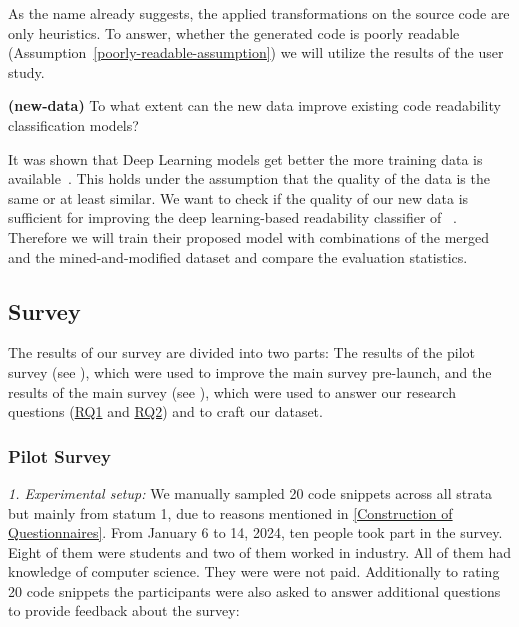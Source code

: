 \documentclass[%
class=scrreprt,
chapterprefix=false,%
open=right,%
twoside=false,%
paper=a4,%
logofile={Logo\_zentral\_farbig\_EN.png},%
thesistype=master,%
UKenglish,%
]{se2thesis}
\theoremstyle{definition}
\begin{document}
	As the name already suggests, the applied transformations on the source code are only heuristics. To answer, whether the generated code is poorly readable (Assumption~\ref{poorly-readable-assumption}) we will utilize the results of the user study.
	
	
	\begin{resq} \textbf{(new-data)} To what extent can the new data improve existing code readability classification models?\end{resq} \label{new-data}
	It was shown that Deep Learning models get better the more training data is available~\cite{hestness2017deep}. This holds under the assumption that the quality of the data is the same or at least similar. We want to check if the quality of our new data is sufficient for improving the deep learning-based readability classifier of \citeauthor{mi2022towards}~\cite{mi2022towards}. Therefore we will train their proposed model with combinations of the merged and the mined-and-modified dataset and compare the evaluation statistics.

\subsection{Survey} \label{Survey}
	The results of our survey are divided into two parts: The results of the pilot survey (see ), which were used to improve the main survey pre-launch, and the results of the main survey (see ), which were used to answer our research questions (\hyperref[mined-well]{RQ1} and \hyperref[modify-poor]{RQ2}) and to craft our dataset.
	
\subsubsection{Pilot Survey} \label{Pilot Survey}
	
	\textit{1. Experimental setup:}
	We manually sampled 20 code snippets across all strata but mainly from statum 1, due to reasons mentioned in \autoref{Construction of Questionnaires}. From January 6 to 14, 2024, ten people took part in the survey. Eight of them were students and two of them worked in industry. All of them had knowledge of computer science. They were were not paid. Additionally to rating 20 code snippets the participants were also asked to answer additional questions to provide feedback about the survey:
	
\end{document}
